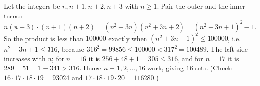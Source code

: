 Let the integers be $n,n+1,n+2,n+3$ with $n\ge1$. Pair the outer and the inner terms:
\[
n(n+3)\cdot(n+1)(n+2)=(n^2+3n)(n^2+3n+2)=(n^2+3n+1)^2-1 .
\]
So the product is less than $100000$ exactly when $(n^2+3n+1)^2\le100000$, i.e.\ $n^2+3n+1\le316$, because $316^2=99856\le100000<317^2=100489$. The left side increases with $n$; for $n=16$ it is $256+48+1=305\le316$, and for $n=17$ it is $289+51+1=341>316$. Hence $n=1,2,\dots,16$ work, giving $\boxed{16}$ sets. (Check: $16\cdot17\cdot18\cdot19=93024$ and $17\cdot18\cdot19\cdot20=116280$.)

